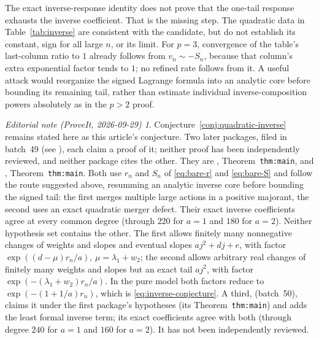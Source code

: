 \documentclass[11pt,a4paper]{article}
\numberwithin{equation}{section}
\theoremstyle{definition}
\theoremstyle{remark}
\newtheorem*{ednote}{Editorial note (ProveIt, 2026-09-29)}
\begin{document}
The exact inverse-response identity does not prove that the one-tail
response exhausts the inverse coefficient. That is the missing step.
The quadratic data in Table~\ref{tab:inverse} are consistent with the
candidate, but do not establish its constant, sign for all large $n$, or
its limit. For $p=3$, convergence of the table's last-column ratio to $1$
already follows from $v_n\sim-S_n$, because that column's extra exponential
factor tends to $1$; no refined rate follows from it.
A useful attack would reorganize the signed Lagrange formula into an
analytic core before bounding its remaining tail, rather than estimate
individual inverse-composition powers absolutely as in the $p>2$ proof.

\begin{ednote}
Conjecture~\ref{conj:quadratic-inverse} remains stated here as this
article's conjecture. Two later packages, filed in batch~49 (see
), each claim a proof of it; neither proof
has been independently reviewed, and neither package cites the other.
They are \cite{ed:qef}, Theorem~\texttt{thm:main}, and \cite{ed:sqf},
Theorem~\texttt{thm:main}. Both use $r_n$ and $S_n$ of
\eqref{eq:bare-r} and \eqref{eq:bare-S} and follow the route suggested
above, resumming an analytic inverse core before bounding the signed tail:
the first merges multiple large actions in a positive majorant, the second
uses an exact quadratic merger defect. Their exact inverse coefficients
agree at every common degree (through $220$ for $a=1$ and $180$ for
$a=2$). Neither hypothesis set contains the other. The first allows
finitely many nonnegative changes of weights and slopes and eventual
slopes $aj^2+dj+e$, with factor $\exp((d-\mu)r_n/a)$,
$\mu=\lambda_1+w_2$; the second allows arbitrary real changes of finitely
many weights and slopes but an exact tail $aj^2$, with factor
$\exp(-(\lambda_1+w_2)r_n/a)$. In the pure model both factors reduce to
$\exp(-(1+1/a)r_n)$, which is \eqref{eq:inverse-conjecture}.
A third,  (batch~50),
claims it under the first package's hypotheses (its
Theorem~\texttt{thm:main}) and adds the least formal inverse term; its
exact coefficients agree with both (through degree $240$ for $a=1$ and
$160$ for $a=2$). It has not been independently reviewed.
\end{ednote}
\end{document}
